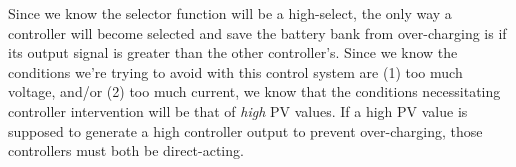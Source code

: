 Since we know the selector function will be a high-select, the only way a controller will become selected and save the battery bank from over-charging is if its output signal is greater than the other controller's.  Since we know the conditions we're trying to avoid with this control system are (1) too much voltage, and/or (2) too much current, we know that the conditions necessitating controller intervention will be that of {\it high} PV values.  If a high PV value is supposed to generate a high controller output to prevent over-charging, those controllers must both be direct-acting.



